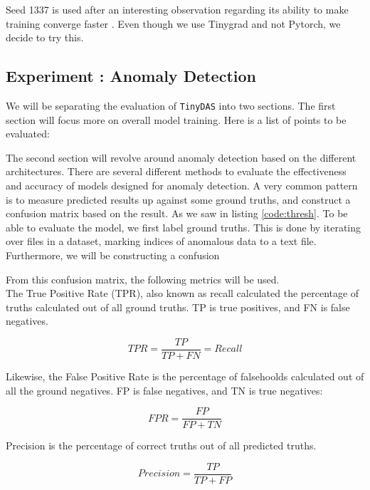 Seed 1337 is used after an interesting observation regarding its ability to make training converge faster \cite{picard2023torchmanualseed3407needinfluencerandom}. Even though we use Tinygrad and not Pytorch, we decide to try this.

\subsection{Experiment : Anomaly Detection}

We will be separating the evaluation of \texttt{TinyDAS} into two sections. The first section will focus more on overall model training. Here is a list of points to be evaluated: 


The second section will revolve around anomaly detection based on the different architectures. There are several different methods to evaluate the effectiveness and accuracy of models designed for anomaly detection. A very common pattern is to measure predicted results up against some ground truths, and construct a confusion matrix based on the result. As we saw in listing \ref{code:thresh}. To be able to evaluate the model, we first label ground truths. This is done by iterating over files in a dataset, marking indices of anomalous data to a text file. Furthermore, we will be constructing a confusion 

From this confusion matrix, the following metrics will be used. \\ 


The True Positive Rate (TPR), also known as recall calculated the percentage of truths calculated out of all ground truths. TP is true positives, and FN is false negatives. 

\begin{equation}
    TPR = \frac{TP}{TP + FN} = Recall
\end{equation}
\vspace{0.2cm}

Likewise, the False Positive Rate is the percentage of falsehoolds calculated out of all the ground negatives. FP is false negatives, and TN is true negatives:

\begin{equation}
    FPR = \frac{FP}{FP + TN}
\end{equation}
\vspace{0.2cm}

Precision is the percentage of correct truths out of all predicted truths.

\begin{equation}
    Precision = \frac{TP}{TP + FP}
\end{equation}

